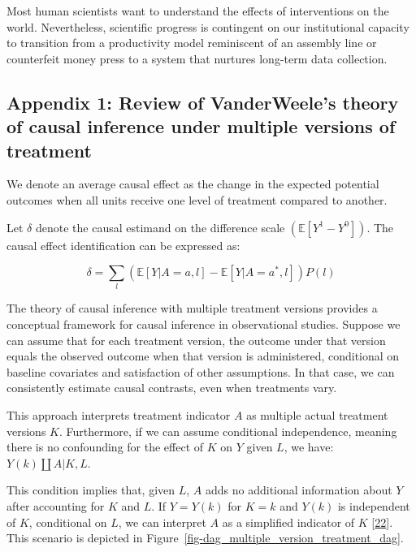 \documentclass[
  singlecolumn]{article}
\begin{document}
Most human scientists want to understand the effects of interventions on
the world. Nevertheless, scientific progress is contingent on our
institutional capacity to transition from a productivity model
reminiscent of an assembly line or counterfeit money press to a system
that nurtures long-term data collection.

\newpage{}

\hypertarget{appendix-1-review-of-vanderweeles-theory-of-causal-inference-under-multiple-versions-of-treatment}{%
\subsection{Appendix 1: Review of VanderWeele's theory of causal
inference under multiple versions of
treatment}\label{appendix-1-review-of-vanderweeles-theory-of-causal-inference-under-multiple-versions-of-treatment}}

We denote an average causal effect as the change in the expected
potential outcomes when all units receive one level of treatment
compared to another.

Let \(\delta\) denote the causal estimand on the difference scale
\((\mathbb{E}[Y^1 - Y^0])\). The causal effect identification can be
expressed as:

\[ \delta = \sum_l \left( \mathbb{E}[Y|A=a,l] - \mathbb{E}[Y|A=a^*,l] \right) P(l)\]

The theory of causal inference with multiple treatment versions provides
a conceptual framework for causal inference in observational studies.
Suppose we can assume that for each treatment version, the outcome under
that version equals the observed outcome when that version is
administered, conditional on baseline covariates and satisfaction of
other assumptions. In that case, we can consistently estimate causal
contrasts, even when treatments vary.

This approach interprets treatment indicator \(A\) as multiple actual
treatment versions \(K\). Furthermore, if we can assume conditional
independence, meaning there is no confounding for the effect of \(K\) on
\(Y\) given \(L\), we have: \(Y(k)\coprod A|K,L\).

This condition implies that, given \(L\), \(A\) adds no additional
information about \(Y\) after accounting for \(K\) and \(L\). If
\(Y = Y(k)\) for \(K = k\) and \(Y(k)\) is independent of \(K\),
conditional on \(L\), we can interpret \(A\) as a simplified indicator
of \(K\) {[}\protect\hyperlink{ref-vanderweele2013}{22}{]}. This
scenario is depicted in
Figure~\ref{fig-dag_multiple_version_treatment_dag}.
\end{document}
